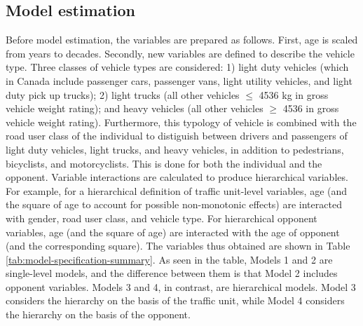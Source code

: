 \documentclass[]{elsarticle} %
\begin{document}
\hypertarget{sec:model-estimation}{%
\subsection{Model estimation}\label{sec:model-estimation}}

Before model estimation, the variables are prepared as follows. First,
age is scaled from years to decades. Secondly, new variables are defined
to describe the vehicle type. Three classes of vehicle types are
considered: 1) light duty vehicles (which in Canada include passenger
cars, passenger vans, light utility vehicles, and light duty pick up
trucks); 2) light trucks (all other vehicles \(\le\) 4536 kg in gross
vehicle weight rating); and heavy vehicles (all other vehicles \(\ge\)
4536 in gross vehicle weight rating). Furthermore, this typology of
vehicle is combined with the road user class of the individual to
distiguish between drivers and passengers of light duty vehicles, light
trucks, and heavy vehicles, in addition to pedestrians, bicyclists, and
motorcyclists. This is done for both the individual and the opponent.
Variable interactions are calculated to produce hierarchical variables.
For example, for a hierarchical definition of traffic unit-level
variables, age (and the square of age to account for possible
non-monotonic effects) are interacted with gender, road user class, and
vehicle type. For hierarchical opponent variables, age (and the square
of age) are interacted with the age of opponent (and the corresponding
square). The variables thus obtained are shown in Table
\ref{tab:model-specification-summary}. As seen in the table, Models 1
and 2 are single-level models, and the difference between them is that
Model 2 includes opponent variables. Models 3 and 4, in contrast, are
hierarchical models. Model 3 considers the hierarchy on the basis of the
traffic unit, while Model 4 considers the hierarchy on the basis of the
opponent.
\end{document}
